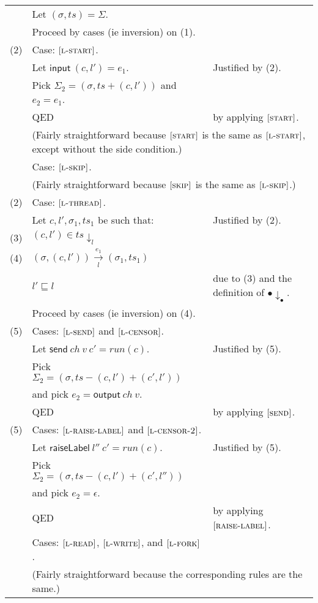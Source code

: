 \documentclass{article}
\newcommand{\rn}[1]{\text{\textsc{[#1]}}}
\newcommand{\ltsteparrow}[2]{\overset{#2}{\underset{#1}{\longrightarrow}}}
\newcommand{\ltstep}[4]{#3\ltsteparrow{#1}{#2}#4}
\newcommand{\hole}{{\bullet}}
\newcommand{\thread}[2]{(#1,#2)}
\newcommand{\opsend}[3]{\textsf{send}~#1~#2~#3}
\newcommand{\opraiselabel}[2]{\textsf{raiseLabel}~#1~#2}
\newcommand{\evstart}[1]{\textsf{input}~#1}
\newcommand{\evsend}[2]{\textsf{output}~#1~#2}
\newcommand{\proj}[2]{#1{\downarrow_{#2}}}
\begin{document}
\begin{tabular}{l@{$\qquad$}l@{\qquad}l}
        & Let $(\sigma,ts)=\Sigma$.
\\
        & Proceed by cases (ie inversion) on (1).
\\
  (2)   & Case: $\rn{l-start}$.
\\
        & \z Let $\evstart{\thread{c}{l'}}=e_1$.
        & Justified by (2).
\\
        & \z Pick $\Sigma_2 = (\sigma,ts+\thread{c}{l'})$ and $e_2=e_1$.
\\
        & \z QED
        & by applying $\rn{start}$.
\\
        & \multicolumn{2}{l}{\z (Fairly straightforward because $\rn{start}$ is the same as $\rn{l-start}$, except without the side condition.)}
\\
        & Case: $\rn{l-skip}$.
\\
        & \multicolumn{2}{l}{\z (Fairly straightforward because $\rn{skip}$ is the same as $\rn{l-skip}$.)}
\\
  (2)   & Case: $\rn{l-thread}$.
\\
        & \z Let $c,l',\sigma_1,ts_1$ be such that:
        & Justified by (2).
\\
  (3)   & \z \z $\thread{c}{l'}\in\proj{ts}{l}$
\\
  (4)   & \z \z $\ltstep{l}{e_1}{(\sigma,\thread{c}{l'})}{(\sigma_1,ts_1)}$
\\
        & \z $l'\sqsubseteq l$
        & due to (3) and the definition of $\proj{\hole}{\hole}$.
\\
        & \z Proceed by cases (ie inversion) on (4).
\\
  (5)   & \z Cases: $\rn{l-send}$ and $\rn{l-censor}$.
\\
        & \z \z Let $\opsend{ch}{v}{c'}=run(c)$.
        & Justified by (5).
\\
        & \z \z Pick $\Sigma_2 = (\sigma,ts-\thread{c}{l'}+\thread{c'}{l'})$
\\
        & \z \z and pick $e_2 = \evsend{ch}{v}$.
\\
        & \z \z QED
        & by applying $\rn{send}$.
\\
  (5)   & \z Cases: $\rn{l-raise-label}$ and $\rn{l-censor-2}$.
\\
        & \z \z Let $\opraiselabel{l''}{c'}=run(c)$.
        & Justified by (5).
\\
        & \z \z Pick $\Sigma_2 = (\sigma,ts-\thread{c}{l'}+\thread{c'}{l''})$
\\
        & \z \z and pick $e_2 = \epsilon$.
\\
        & \z \z QED
        & by applying $\rn{raise-label}$.
\\
        & \z Cases: $\rn{l-read}$, $\rn{l-write}$, and $\rn{l-fork}$.
\\
        & \multicolumn{2}{l}{\z \z (Fairly straightforward because the corresponding rules are the same.)}
\end{tabular}
\end{document}
